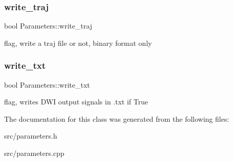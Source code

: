 \subsubsection{\texorpdfstring{write\+\_\+traj}{write\_traj}}
{\footnotesize\ttfamily bool Parameters\+::write\+\_\+traj}

flag, write a traj file or not, binary format only \mbox{\label{class_parameters_a15446bf0727ebfe03f119821c7d8ed0f}} 
\subsubsection{\texorpdfstring{write\+\_\+txt}{write\_txt}}
{\footnotesize\ttfamily bool Parameters\+::write\+\_\+txt}

flag, writes D\+WI output signals in .txt if True 

The documentation for this class was generated from the following files\+:\begin{DoxyCompactItemize}
\item 
src/parameters.\+h\item 
src/parameters.\+cpp\end{DoxyCompactItemize}
